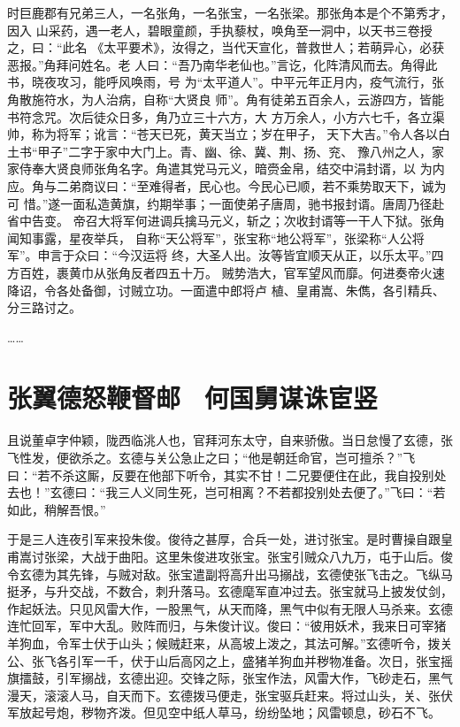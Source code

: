 \documentclass{ctexbook}
\begin{document}
 时巨鹿郡有兄弟三人，一名张角，一名张宝，一名张梁。那张角本是个不第秀才，因入
山采药，遇一老人，碧眼童颜，手执藜杖，唤角至一洞中，以天书三卷授之，曰：“此名
《太平要术》，汝得之，当代天宣化，普救世人；若萌异心，必获恶报。”角拜问姓名。老
人曰：“吾乃南华老仙也。”言讫，化阵清风而去。角得此书，晓夜攻习，能呼风唤雨，号
为“太平道人”。中平元年正月内，疫气流行，张角散施符水，为人治病，自称“大贤良
师”。角有徒弟五百余人，云游四方，皆能书符念咒。次后徒众日多，角乃立三十六方，大
方万余人，小方六七千，各立渠帅，称为将军；讹言：“苍天已死，黄天当立；岁在甲子，
天下大吉。”令人各以白土书“甲子”二字于家中大门上。青、幽、徐、冀、荆、扬、兖、
豫八州之人，家家侍奉大贤良师张角名字。角遣其党马元义，暗赍金帛，结交中涓封谞，以
为内应。角与二弟商议曰：“至难得者，民心也。今民心已顺，若不乘势取天下，诚为可
惜。”遂一面私造黄旗，约期举事；一面使弟子唐周，驰书报封谞。唐周乃径赴省中告变。
帝召大将军何进调兵擒马元义，斩之；次收封谞等一干人下狱。张角闻知事露，星夜举兵，
自称“天公将军”，张宝称“地公将军”，张梁称“人公将军”。申言于众曰：“今汉运将
终，大圣人出。汝等皆宜顺天从正，以乐太平。”四方百姓，裹黄巾从张角反者四五十万。
贼势浩大，官军望风而靡。何进奏帝火速降诏，令各处备御，讨贼立功。一面遣中郎将卢
植、皇甫嵩、朱儁，各引精兵、分三路讨之。

……

\chapter{张翼德怒鞭督邮 \ 何国舅谋诛宦竖}

且说董卓字仲颖，陇西临洮人也，官拜河东太守，自来骄傲。当日怠慢了玄德，张飞性发，便欲杀之。玄德与关公急止之曰；“他是朝廷命官，岂可擅杀？”飞曰：“若不杀这厮，反要在他部下听令，其实不甘！二兄要便住在此，我自投别处去也！”玄德曰：“我三人义同生死，岂可相离？不若都投别处去便了。”飞曰：“若如此，稍解吾恨。”

于是三人连夜引军来投朱俊。俊待之甚厚，合兵一处，进讨张宝。是时曹操自跟皇甫嵩讨张梁，大战于曲阳。这里朱俊进攻张宝。张宝引贼众八九万，屯于山后。俊令玄德为其先锋，与贼对敌。张宝遣副将高升出马搦战，玄德使张飞击之。飞纵马挺矛，与升交战，不数合，刺升落马。玄德麾军直冲过去。张宝就马上披发仗剑，作起妖法。只见风雷大作，一股黑气，从天而降，黑气中似有无限人马杀来。玄德连忙回军，军中大乱。败阵而归，与朱俊计议。俊曰：“彼用妖术，我来日可宰猪羊狗血，令军士伏于山头；候贼赶来，从高坡上泼之，其法可解。”玄德听令，拨关公、张飞各引军一千，伏于山后高冈之上，盛猪羊狗血并秽物准备。次日，张宝摇旗擂鼓，引军搦战，玄德出迎。交锋之际，张宝作法，风雷大作，飞砂走石，黑气漫天，滚滚人马，自天而下。玄德拨马便走，张宝驱兵赶来。将过山头，关、张伏军放起号炮，秽物齐泼。但见空中纸人草马，纷纷坠地；风雷顿息，砂石不飞。
\end{document}
